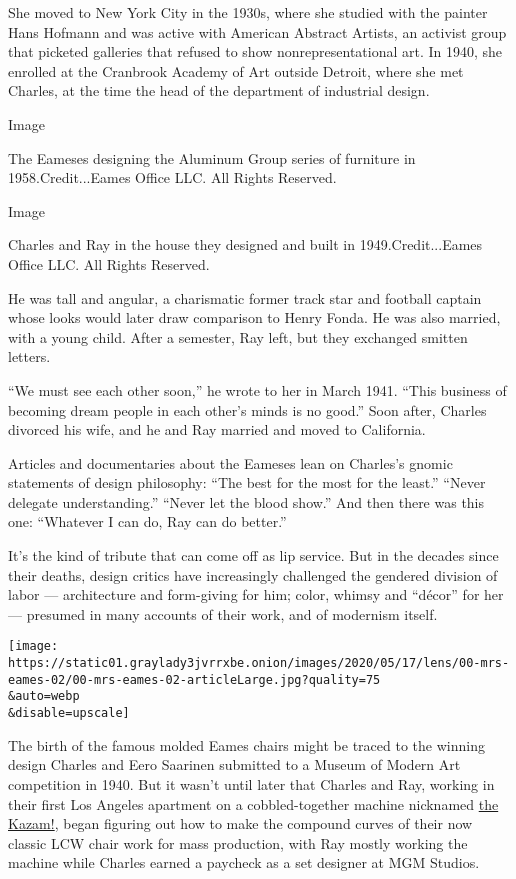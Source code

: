She moved to New York City in the 1930s, where she studied with the
painter Hans Hofmann and was active with American Abstract Artists, an
activist group that picketed galleries that refused to show
nonrepresentational art. In 1940, she enrolled at the Cranbrook Academy
of Art outside Detroit, where she met Charles, at the time the head of
the department of industrial design.

Image

The Eameses designing the Aluminum Group series of furniture in
1958.Credit...Eames Office LLC. All Rights Reserved.

Image

Charles and Ray in the house they designed and built in
1949.Credit...Eames Office LLC. All Rights Reserved.

He was tall and angular, a charismatic former track star and football
captain whose looks would later draw comparison to Henry Fonda. He was
also married, with a young child. After a semester, Ray left, but they
exchanged smitten letters.

``We must see each other soon,'' he wrote to her in March 1941. ``This
business of becoming dream people in each other's minds is no good.''
Soon after, Charles divorced his wife, and he and Ray married and moved
to California.

Articles and documentaries about the Eameses lean on Charles's gnomic
statements of design philosophy: ``The best for the most for the
least.'' ``Never delegate understanding.'' ``Never let the blood show.''
And then there was this one: ``Whatever I can do, Ray can do better.''

It's the kind of tribute that can come off as lip service. But in the
decades since their deaths, design critics have increasingly challenged
the gendered division of labor --- architecture and form-giving for him;
color, whimsy and ``décor'' for her --- presumed in many accounts of
their work, and of modernism itself.

\texttt{[image: https://static01.graylady3jvrrxbe.onion/images/2020/05/17/lens/00-mrs-eames-02/00-mrs-eames-02-articleLarge.jpg?quality=75\\\&auto=webp\\\&disable=upscale]}

The birth of the famous molded Eames chairs might be traced to the
winning design Charles and Eero Saarinen submitted to a Museum of Modern
Art competition in 1940. But it wasn't until later that Charles and Ray,
working in their first Los Angeles apartment on a cobbled-together
machine nicknamed
\href{https://www.eamesoffice.com/blog/the-kazam-machine/}{the Kazam!},
began figuring out how to make the compound curves of their now classic
LCW chair work for mass production, with Ray mostly working the machine
while Charles earned a paycheck as a set designer at MGM Studios.

